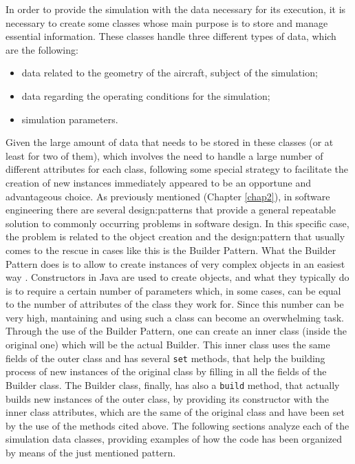 In order to provide the simulation with the data necessary for its execution, it is necessary to create some classes whose main purpose is to store and manage essential information. These classes handle three different types of data, which are the following:
%
\begin{itemize}
\item data related to the geometry of the aircraft, subject of the simulation;
\item data regarding the operating conditions for the simulation;
\item simulation parameters.
\end{itemize}
%
Given the large amount of data that needs to be stored in these classes (or at least for two of them), which involves the need to handle a large number of different attributes for each class, following some special strategy to facilitate the creation of new instances immediately appeared to be an opportune and advantageous choice. As previously mentioned (Chapter \ref{chap2}), in software engineering there are several \gls{design:pattern}s that provide a general repeatable solution to commonly occurring problems in software design. In this specific case, the problem is related to the object creation and the \gls{design:pattern} that usually comes to the rescue in cases like this is the Builder Pattern. What the Builder Pattern does is to allow to create instances of very complex objects in an easiest way \cite{BuilderPatternWiki}. Constructors in Java are used to create objects, and what they typically do is to require a certain number of parameters which, in some cases, can be equal to the number of attributes of the class they work for. Since this number can be very high, mantaining and using such a class can become an overwhelming task. Through the use of the Builder Pattern, one can create an inner class (inside the original one) which will be the actual Builder. This inner class uses the same fields of the outer class and has several \lstinline[language=Java]!set! methods, that help the building process of new instances of the original class by filling in all the fields of the Builder class. The Builder class, finally, has also a \lstinline[language=Java]!build! method, that actually builds new instances of the outer class, by providing its constructor with the inner class attributes, which are the same of the original class and have been set by the use of the methods cited above. The following sections analyze each of the simulation data classes, providing examples of how the code has been organized by means of the just mentioned pattern.

